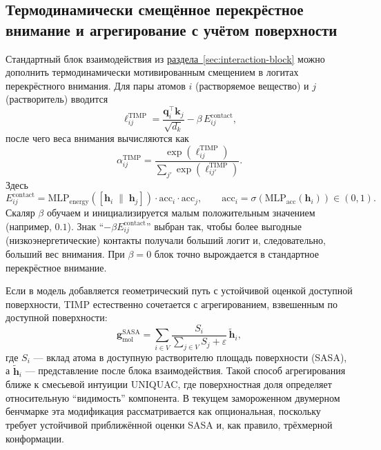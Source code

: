 \documentclass[11pt]{article}
\begin{document}
\subsection{Термодинамически смещённое перекрёстное внимание и агрегирование с учётом поверхности}

Стандартный блок взаимодействия из \hyperref[sec:interaction-block]{раздела~\ref*{sec:interaction-block}} можно дополнить термодинамически мотивированным смещением в логитах перекрёстного внимания. Для пары атомов $i$ (растворяемое вещество) и $j$ (растворитель) вводится
\begin{equation*}
\ell_{ij}^{\mathrm{TIMP}} = \frac{\mathbf{q}_i^\top \mathbf{k}_j}{\sqrt{d_k}} - \beta\,E_{ij}^{\mathrm{contact}},
\end{equation*}
после чего веса внимания вычисляются как
\begin{equation*}
\alpha_{ij}^{\mathrm{TIMP}} = \frac{\exp(\ell_{ij}^{\mathrm{TIMP}})}{\sum_{j'} \exp(\ell_{ij'}^{\mathrm{TIMP}})}.
\end{equation*}
Здесь
\begin{equation*}
E_{ij}^{\mathrm{contact}} = \mathrm{MLP}_{\mathrm{energy}}\!\left([\mathbf{h}_i \;\|\; \mathbf{h}_j]\right)\cdot \mathrm{acc}_i\cdot \mathrm{acc}_j,
\qquad
\mathrm{acc}_i = \sigma\!\left(\mathrm{MLP}_{\mathrm{acc}}(\mathbf{h}_i)\right) \in (0,1).
\end{equation*}
Скаляр $\beta$ обучаем и инициализируется малым положительным значением (например, $0.1$). Знак ``$-\beta E_{ij}^{\mathrm{contact}}$'' выбран так, чтобы более выгодные (низкоэнергетические) контакты получали больший логит и, следовательно, больший вес внимания. При $\beta=0$ блок точно вырождается в стандартное перекрёстное внимание.

Если в модель добавляется геометрический путь с устойчивой оценкой доступной поверхности, TIMP естественно сочетается с агрегированием, взвешенным по доступной поверхности:
\begin{equation*}
\mathbf{g}_{\mathrm{mol}}^{\mathrm{SASA}} = \sum_{i\in V} \frac{S_i}{\sum_{j\in V} S_j + \varepsilon}\,\tilde{\mathbf{h}}_i,
\end{equation*}
где $S_i$ --- вклад атома в доступную растворителю площадь поверхности (SASA), а $\tilde{\mathbf{h}}_i$ --- представление после блока взаимодействия. Такой способ агрегирования ближе к смесьевой интуиции UNIQUAC, где поверхностная доля определяет относительную ``видимость'' компонента. В текущем замороженном двумерном бенчмарке эта модификация рассматривается как опциональная, поскольку требует устойчивой приближённой оценки SASA и, как правило, трёхмерной конформации.
\end{document}
